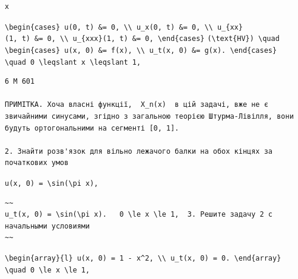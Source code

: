 \documentclass[
  ukrainian,
]{article}
\begin{document}
\begin{verbatim}
x
\end{verbatim}

\texttt{\textbackslash{}begin\{cases\}\ u(0,\ t)\ \&=\ 0,\ \textbackslash{}\textbackslash{}\ u\_x(0,\ t)\ \&=\ 0,\ \textbackslash{}\textbackslash{}\ u\_\{xx\}(1,\ t)\ \&=\ 0,\ \textbackslash{}\textbackslash{}\ u\_\{xxx\}(1,\ t)\ \&=\ 0,\ \textbackslash{}end\{cases\}}
\texttt{(\textbackslash{}text\{HV\})\ \textbackslash{}quad}
\texttt{\textbackslash{}begin\{cases\}\ u(x,\ 0)\ \&=\ f(x),\ \textbackslash{}\textbackslash{}\ u\_t(x,\ 0)\ \&=\ g(x).\ \textbackslash{}end\{cases\}}
\texttt{\textbackslash{}quad\ 0\ \textbackslash{}leqslant\ x\ \textbackslash{}leqslant\ 1,}

\begin{verbatim}
6 M 601

ПРИМІТКА. Хоча власні функції,  X_n(x)  в цій задачі, вже не є звичайними синусами, згідно з загальною теорією Штурма-Лівілля, вони будуть ортогональними на сегменті [0, 1].

2. Знайти розв'язок для вільно лежачого балки на обох кінцях за початкових умов
\end{verbatim}

\texttt{u(x,\ 0)\ =\ \textbackslash{}sin(\textbackslash{}pi\ x),}

\begin{verbatim}
~~
u_t(x, 0) = \sin(\pi x).   0 \le x \le 1,  3. Решите задачу 2 с начальными условиями
~~
\end{verbatim}

\texttt{\textbackslash{}begin\{array\}\{l\}\ u(x,\ 0)\ =\ 1\ -\ x\^{}2,\ \textbackslash{}\textbackslash{}\ u\_t(x,\ 0)\ =\ 0.\ \textbackslash{}end\{array\}}
\texttt{\textbackslash{}quad\ 0\ \textbackslash{}le\ x\ \textbackslash{}le\ 1,}
\end{document}
